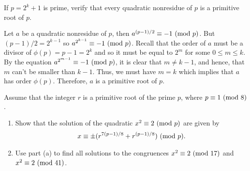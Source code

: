 \begin{exercise}
    If $p = 2^k + 1$ is prime, verify that every quadratic nonresidue of $p$ is a primitive root of $p$.  \\
\end{exercise}

\begin{solution}
    Let $a$ be a quadratic nonresidue of $p$, then $a^{(p-1)/2} \equiv -1 \ (\mathrm{mod}\ p)$. But $(p-1)/2 = 2^{k-1}$ so $a^{2^{k-1}} \equiv -1 \ (\mathrm{mod}\ p)$. Recall that the order of $a$ must be a divisor of $\phi(p) = p-1 = 2^k$ and so it must be equal to $2^m$ for some $0 \leq m \leq k$. By the equation $a^{2^{m-1}} \equiv -1 \ (\mathrm{mod}\ p)$, it is clear that $m \neq k-1$, and hence, that $m$ can't be smaller than $k-1$. Thus, we must have $m = k$ which implies that $a$ has order $\phi(p)$. Therefore, $a$ is a primitive root of $p$. \\
\end{solution}

\begin{exercise}
    Assume that the integer $r$ is a primitive root of the prime $p$, where $p\equiv 1 \ (\mathrm{mod}\ 8)$. 
    \begin{enumerate}
        \item Show that the solution of the quadratic $x^2 \equiv 2 \ (\mathrm{mod}\ p)$ are given by
        $$x \equiv \pm(r^{7(p-1)/8} + r^{(p-1)/8}) \ (\mathrm{mod}\ p).$$
        \item Use part (a) to find all solutions to the congruences $x^2 \equiv 2 \ (\mathrm{mod}\ 17)$ and $x^2 \equiv 2 \ (\mathrm{mod}\ 41)$. \\
    \end{enumerate}
\end{exercise}

